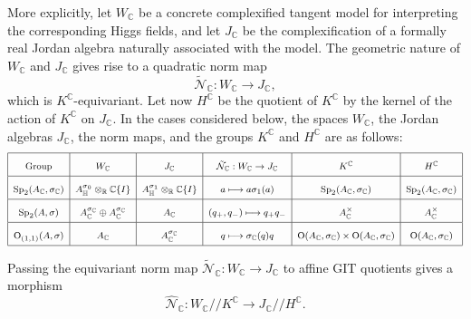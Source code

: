 \documentclass[oneside,11pt]{amsart}
\theoremstyle{definition}
\theoremstyle{remark}
\numberwithin{thm}{section}
\numberwithin{equation}{section}
\begin{document}
More explicitly, let $W_{\mathbb C}$ be a concrete complexified tangent model for interpreting the corresponding Higgs fields, and let $J_{\mathbb C}$ be the complexification of a formally real Jordan algebra naturally associated with the model. The geometric nature of $W_{\mathbb C}$ and $J_{\mathbb C}$ gives rise to a quadratic norm map
\[
\tilde{\mathcal N}_{\mathbb C}: W_{\mathbb{C}}\longrightarrow J_{\mathbb C},
\]
which is $K^{\mathbb{C}}$-equivariant. Let now $H^{\mathbb{C}}$ be the quotient of $K^{\mathbb{C}}$ by the kernel of the action of $K^{\mathbb{C}}$ on $J_{\mathbb{C}}$. In the cases considered below, the spaces $W_{\mathbb C}$, the Jordan algebras $J_{\mathbb C}$, the norm maps, and the groups $K^{\mathbb{C}}$ and $H^{\mathbb{C}}$ are as follows:
\[
\footnotesize
\renewcommand{\arraystretch}{2.1}
\begin{array}{|c|c|c|c|c|c|}
\hline
\text{Group} & W_{\mathbb C} & J_{\mathbb C} & \tilde{\mathcal N}_{\mathbb C}: W_{\mathbb{C}}\rightarrow J_{\mathbb C} & K^{\mathbb C} & H^{\mathbb C} \\
\hline
\mathrm{Sp}_2(A_{\mathbb C},\sigma_{\mathbb C})&A_{\mathbb H}^{\sigma_0}\otimes_{\mathbb R}\mathbb C\{I\}&A_{\mathbb H}^{\sigma_1}\otimes_{\mathbb R}\mathbb C\{I\}&a\longmapsto a\sigma_1(a)&\mathrm{Sp}_2(A_{\mathbb C},\sigma_{\mathbb C})&
\mathrm{Sp}_2(A_{\mathbb C},\sigma_{\mathbb C})
\\
\hline
\mathrm{Sp}_2(A,\sigma)&A_{\mathbb C}^{\sigma_{\mathbb C}}\oplus A_{\mathbb C}^{\sigma_{\mathbb C}}&A_{\mathbb C}&(q_+,q_-)\longmapsto q_+q_-&A_{\mathbb C}^{\times}&A_{\mathbb C}^{\times}
\\
\hline
\mathrm O_{(1,1)}(A,\sigma)&A_{\mathbb C}&A_{\mathbb C}^{\sigma_{\mathbb C}}&q\longmapsto \sigma_{\mathbb C}(q)q&\mathrm O(A_{\mathbb C},\sigma_{\mathbb C})\times\mathrm O(A_{\mathbb C},\sigma_{\mathbb C})&\mathrm O(A_{\mathbb C},\sigma_{\mathbb C})
\\
\hline
\end{array}
\]

Passing the equivariant norm map $\tilde{\mathcal N}_{\mathbb C}: W_{\mathbb{C}}\rightarrow J_{\mathbb C}$ to affine GIT quotients
gives a morphism
\[
\hat{\mathcal{N}}_{\mathbb C}: W_{\mathbb C}/\!\!/K^{\mathbb C}\longrightarrow J_{\mathbb C}/\!\!/H^{\mathbb C}.
\]
\end{document}
